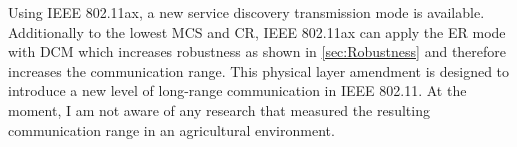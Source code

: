 Using IEEE 802.11ax, a new service discovery transmission mode is available.
Additionally to the lowest \ac{MCS} and \ac{CR},
IEEE 802.11ax can apply the \ac{ER} mode with \ac{DCM} which increases robustness as shown in \autoref{sec:Robustness}
and therefore increases the communication range.
This physical layer amendment is designed to introduce a new level of long-range communication in IEEE 802.11.
At the moment, I am not aware of any research that measured the resulting communication range in an agricultural environment.








